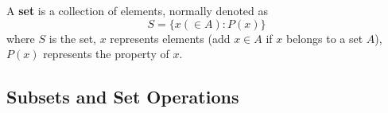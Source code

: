 A \textbf{set} is a collection of elements, normally denoted as
$$
S = \{x (\in A):P(x)\}
$$
where $S$ is the set, $x$ represents elements (add $x\in A$ if $x$ belongs to a set $A$), $P(x)$ represents the property of $x$.

\subsection{Subsets and Set Operations}